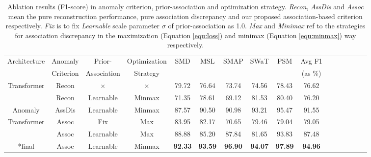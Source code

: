 \documentclass{article} %
\begin{document}
\begin{table}[h]
    \vspace{-5pt}
    \caption{Ablation results (F1-score) in anomaly criterion, prior-association and optimization strategy. \emph{Recon}, \emph{AssDis} and \emph{Assoc} mean the pure reconstruction performance, pure association discrepancy and our proposed association-based criterion respectively. \emph{Fix} is to fix \emph{Learnable} scale parameter $\sigma$ of prior-association as 1.0. \emph{Max} and \emph{Minimax} ref to the strategies for association discrepancy in the maximization (Equation \ref{equ:loss}) and minimax (Equation \ref{equ:minmax}) way respectively. }\label{tab:ablation}
    \vspace{-5pt}
    \centering
    \begin{small}
    \renewcommand{\multirowsetup}{\centering}
    \setlength{\tabcolsep}{4.8pt}
    \begin{tabular}{cccc|ccccc|ccccccc}
    \toprule
    \multirow{2}{*}{Architecture} & Anomaly & Prior- & Optimization & \multirow{2}{*}{SMD} & \multirow{2}{*}{MSL} & \multirow{2}{*}{SMAP} & \multirow{2}{*}{SWaT} & \multirow{2}{*}{PSM} & Avg F1 \\
     &  Criterion & Association & Strategy & & & & & & (as \%)\\
    \midrule
    Transformer & Recon & $\times$ & $\times$ & 79.72 & 76.64 & 73.74 & 74.56 & 78.43 & 76.62 \\
    \midrule

     & Recon & Learnable & Minmax & 71.35 & 78.61 & 69.12 & 81.53 & 80.40 & 76.20 \\
    \cmidrule(lr){5-10}
    Anomaly & AssDis & Learnable & Minmax & 87.57 & 90.50 & 90.98 & 93.21 & 95.47 & 91.55 \\
    \cmidrule(lr){2-10}
    Transformer & Assoc & Fix & Max & 83.95 & 82.17 & 70.65 & 79.46 & 79.04 & 79.05 \\
    \cmidrule(lr){3-10}
     & Assoc & Learnable & Max & 88.88 & 85.20 & 87.84 & 81.65 & 93.83 & 87.48 \\
    \cmidrule(lr){4-10}
    *final & Assoc & Learnable & Minmax & \textbf{92.33} & \textbf{93.59} & \textbf{96.90} & \textbf{94.07} & \textbf{97.89} & \textbf{94.96}\\
    \bottomrule
    \end{tabular}
    \end{small}
    \vspace{-10pt}
\end{table}
\end{document}
